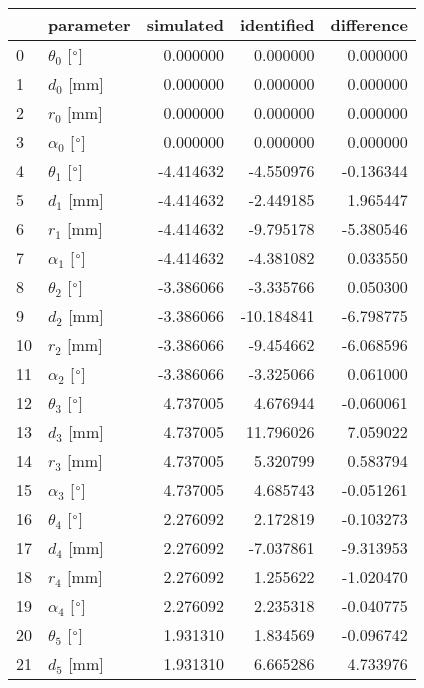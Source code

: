 \documentclass{standalone}%
\begin{document}
%
\normalsize%
\begin{tabular}{llrrr}
\toprule
{} &                 parameter & simulated & identified & difference \\
\midrule
0  &  $\theta_{0}$ [$\degree$] &  0.000000 &   0.000000 &   0.000000 \\
1  &              $d_{0}$ [mm] &  0.000000 &   0.000000 &   0.000000 \\
2  &              $r_{0}$ [mm] &  0.000000 &   0.000000 &   0.000000 \\
3  &  $\alpha_{0}$ [$\degree$] &  0.000000 &   0.000000 &   0.000000 \\
4  &  $\theta_{1}$ [$\degree$] & -4.414632 &  -4.550976 &  -0.136344 \\
5  &              $d_{1}$ [mm] & -4.414632 &  -2.449185 &   1.965447 \\
6  &              $r_{1}$ [mm] & -4.414632 &  -9.795178 &  -5.380546 \\
7  &  $\alpha_{1}$ [$\degree$] & -4.414632 &  -4.381082 &   0.033550 \\
8  &  $\theta_{2}$ [$\degree$] & -3.386066 &  -3.335766 &   0.050300 \\
9  &              $d_{2}$ [mm] & -3.386066 & -10.184841 &  -6.798775 \\
10 &              $r_{2}$ [mm] & -3.386066 &  -9.454662 &  -6.068596 \\
11 &  $\alpha_{2}$ [$\degree$] & -3.386066 &  -3.325066 &   0.061000 \\
12 &  $\theta_{3}$ [$\degree$] &  4.737005 &   4.676944 &  -0.060061 \\
13 &              $d_{3}$ [mm] &  4.737005 &  11.796026 &   7.059022 \\
14 &              $r_{3}$ [mm] &  4.737005 &   5.320799 &   0.583794 \\
15 &  $\alpha_{3}$ [$\degree$] &  4.737005 &   4.685743 &  -0.051261 \\
16 &  $\theta_{4}$ [$\degree$] &  2.276092 &   2.172819 &  -0.103273 \\
17 &              $d_{4}$ [mm] &  2.276092 &  -7.037861 &  -9.313953 \\
18 &              $r_{4}$ [mm] &  2.276092 &   1.255622 &  -1.020470 \\
19 &  $\alpha_{4}$ [$\degree$] &  2.276092 &   2.235318 &  -0.040775 \\
20 &  $\theta_{5}$ [$\degree$] &  1.931310 &   1.834569 &  -0.096742 \\
21 &              $d_{5}$ [mm] &  1.931310 &   6.665286 &   4.733976 \\

\end{tabular}
\end{document}
